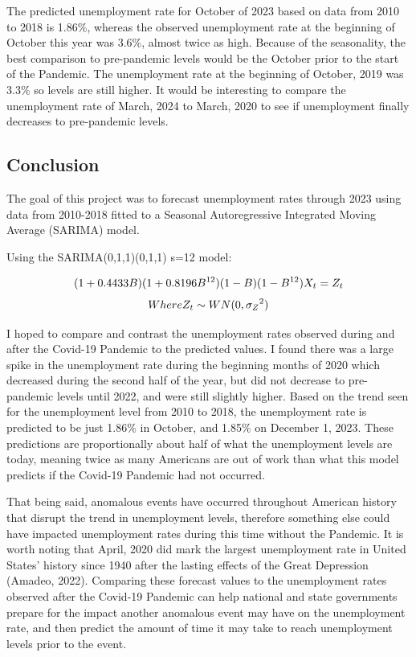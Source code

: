 \documentclass[
  letterpaper,
  DIV=11,
  numbers=noendperiod]{scrartcl}
\begin{document}
The predicted unemployment rate for October of 2023 based on data from
2010 to 2018 is 1.86\%, whereas the observed unemployment rate at the
beginning of October this year was 3.6\%, almost twice as high. Because
of the seasonality, the best comparison to pre-pandemic levels would be
the October prior to the start of the Pandemic. The unemployment rate at
the beginning of October, 2019 was 3.3\% so levels are still higher. It
would be interesting to compare the unemployment rate of March, 2024 to
March, 2020 to see if unemployment finally decreases to pre-pandemic
levels.

\hypertarget{conclusion}{%
\subsection{Conclusion}\label{conclusion}}

The goal of this project was to forecast unemployment rates through 2023
using data from 2010-2018 fitted to a Seasonal Autoregressive Integrated
Moving Average (SARIMA) model.

Using the SARIMA(0,1,1)(0,1,1) s=12 model:

\[
(1+0.4433B)(1+0.8196B^{12})(1-B)(1-B^{12}){X_t} = {Z_t} \space \space
\] \[
Where \space {Z_t} \sim WN(0,{\sigma_Z}^2)
\]

I hoped to compare and contrast the unemployment rates observed during
and after the Covid-19 Pandemic to the predicted values. I found there
was a large spike in the unemployment rate during the beginning months
of 2020 which decreased during the second half of the year, but did not
decrease to pre-pandemic levels until 2022, and were still slightly
higher. Based on the trend seen for the unemployment level from 2010 to
2018, the unemployment rate is predicted to be just 1.86\% in October,
and 1.85\% on December 1, 2023. These predictions are proportionally
about half of what the unemployment levels are today, meaning twice as
many Americans are out of work than what this model predicts if the
Covid-19 Pandemic had not occurred.

That being said, anomalous events have occurred throughout American
history that disrupt the trend in unemployment levels, therefore
something else could have impacted unemployment rates during this time
without the Pandemic. It is worth noting that April, 2020 did mark the
largest unemployment rate in United States' history since 1940 after the
lasting effects of the Great Depression (Amadeo, 2022). Comparing these
forecast values to the unemployment rates observed after the Covid-19
Pandemic can help national and state governments prepare for the impact
another anomalous event may have on the unemployment rate, and then
predict the amount of time it may take to reach unemployment levels
prior to the event.
\end{document}
